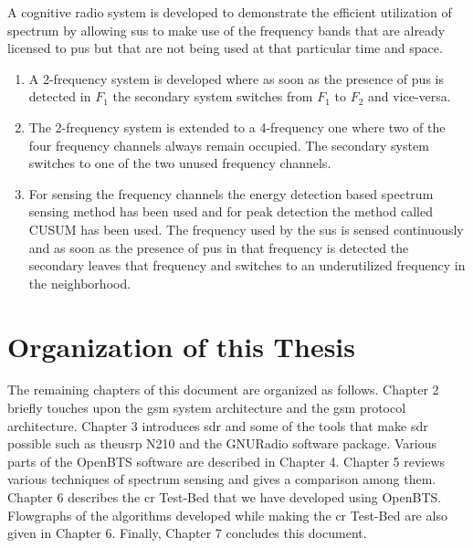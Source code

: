 A cognitive radio system is developed to demonstrate the efficient 
utilization of spectrum by allowing \glspl{su} to make use of the 
frequency bands that are already licensed to \glspl{pu} but that are not 
being used at that particular time and space.

\begin{enumerate}
    \item A 2-frequency system is developed where as soon as the presence of 
    \glspl{pu} is detected in $F_1$  the secondary system switches from $F_1$ 
    to $F_2$ and vice-versa.
    \item The 2-frequency system is extended to a 4-frequency one where
    two of the four frequency channels always remain occupied. The secondary
    system switches to one of the two unused frequency channels.
    \item For sensing the frequency channels the energy detection based
    spectrum sensing method has been used and for peak detection the method 
    called CUSUM has been used. The frequency used by the \glspl{su} is
    sensed continuously and as soon as the presence of \glspl{pu} in that 
    frequency is detected the secondary leaves that frequency and switches to
    an underutilized frequency in the neighborhood.
\end{enumerate}



\section{Organization of this Thesis}
The remaining chapters of this document are organized as follows. Chapter 2 
briefly touches upon the \gls{gsm} system architecture and the \gls{gsm} protocol 
architecture. Chapter 3 introduces \gls{sdr} and some of the
tools that make \gls{sdr} possible such as the\gls{usrp} N210
and the GNURadio software package. Various parts of the OpenBTS 
software are described in Chapter 4. Chapter 5 reviews various techniques of 
spectrum sensing and gives a comparison among them. Chapter 6 describes the 
\gls{cr} Test-Bed that we have developed using OpenBTS. Flowgraphs of
the algorithms developed while making the \gls{cr} Test-Bed are also given in
Chapter 6. Finally, Chapter 7 concludes this document.
